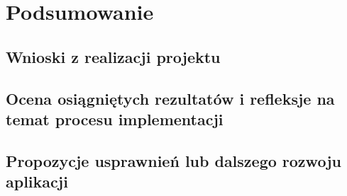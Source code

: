 \documentclass[../../spr.tex]{subfiles}
\begin{document}
\section{Podsumowanie}

\subsection{Wnioski z realizacji projektu}

\subsection{Ocena osiągniętych rezultatów i refleksje na temat procesu implementacji}

\subsection{Propozycje usprawnień lub dalszego rozwoju aplikacji}
\end{document}
